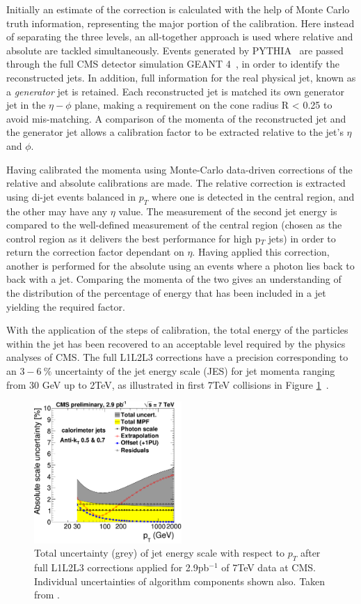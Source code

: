 Initially an estimate of the correction is calculated with the help of Monte Carlo truth information, representing the major portion of the calibration. Here instead of separating the three levels, an all-together approach is used where relative and absolute are tackled simultaneously. Events generated by \textsc{PYTHIA}~\cite{pythia} are passed through the full CMS detector simulation \textsc{GEANT 4}~\cite{GEANT4}, in order to identify the reconstructed jets. In addition, full information for the real physical jet, known as a \textit{generator} jet is retained. Each reconstructed jet is matched its own generator jet in the $\eta - \phi$ plane, making a requirement on the cone radius R < 0.25 to avoid mis-matching. A comparison of the momenta of the reconstructed jet and the generator jet allows a calibration factor to be extracted relative to the jet's $\eta$ and $\phi$. 

Having calibrated the momenta using Monte-Carlo data-driven corrections of the relative and absolute calibrations are made. The relative correction is extracted using di-jet events balanced in $p_{T}$ where one is detected in the central region, and the other may have any $\eta$ value. The measurement of the second jet energy is compared to the well-defined measurement of the central region (chosen as the control region as it delivers the best performance for high p$_{T}$ jets) in order to return the correction factor dependant on $\eta$.  Having applied this correction, another is performed for the absolute using an events where a photon lies back to back with a jet. Comparing the momenta of the two gives an understanding of the distribution of the percentage of energy that has been included in a jet yielding the required factor.

With the application of the steps of calibration, the total energy of the particles within the jet has been recovered to an acceptable level required by the physics analyses of CMS. The full L1L2L3 corrections have a precision corresponding to an $3 - 6~\%$ uncertainty of the jet energy scale (JES) for jet momenta ranging from 30 GeV up to 2TeV, as illustrated in first 7TeV collisions in Figure \ref{fig:JESU}~\cite{JME-10-010}.


\begin{figure}
\centering
\includegraphics[width=0.5\textwidth]{Figures/Objects/JESU}
\caption{\label{fig:JESU}Total uncertainty (grey) of jet energy scale with respect to $p_{T}$ after full L1L2L3 corrections applied for 2.9pb$^{-1}$ of 7TeV data at CMS. Individual uncertainties of algorithm components shown also. Taken from \cite{JME-10-010}.}
\end{figure}

